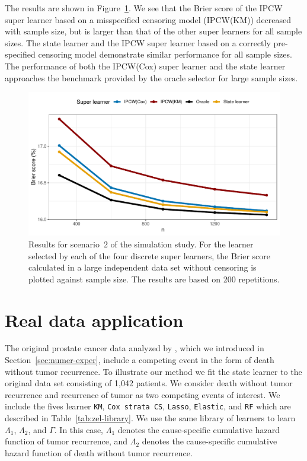 \documentclass[a4,danish]{article}
\begin{document}
The results are shown in Figure~\ref{fig:zelefski}. We see that the Brier score
of the IPCW super learner based on a misspecified censoring model (IPCW(KM))
decreased with sample size, but is larger than that of the other super learners
for all sample sizes. The state learner and the IPCW super learner based on a
correctly pre-specified censoring model demonstrate similar performance for all
sample sizes. The performance of both the IPCW(Cox) super learner and the state
learner approaches the benchmark provided by the oracle selector for large sample
sizes.
\begin{figure}
  \centerline{\includegraphics[width=1\linewidth]{./figures/zelefski-sim.pdf}}
  \caption[]{Results for scenario~2 of the simulation study. For the learner
    selected by each of the four discrete super learners, the Brier score
    calculated in a large independent data set without censoring is plotted
    against sample size. The results are based on 200 repetitions.}
  \label{fig:zelefski}
\end{figure}

\section{Real data application}
\label{sec:real-data-appl}

The original prostate cancer data analyzed by \cite{kattan2000pretreatment},
which we introduced in Section~\ref{sec:numer-exper}, include a competing event
in the form of death without tumor recurrence. To illustrate our method we fit
the state learner to the original data set consisting of 1,042 patients. We
consider death without tumor recurrence and recurrence of tumor as two competing
events of interest. We include the fives learner \texttt{KM}, \texttt{Cox strata
  CS}, \texttt{Lasso}, \texttt{Elastic}, and \texttt{RF} which are described in
Table~\ref{tab:zel-library}. We use the same library of learners to learn
\( \Lambda_1 \), \( \Lambda_2 \), and $\Gamma$. In this case, \( \Lambda_1 \)
denotes the cause-specific cumulative hazard function of tumor recurrence, and
\( \Lambda_2 \) denotes the cause-specific cumulative hazard function of death
without tumor recurrence.
\end{document}
